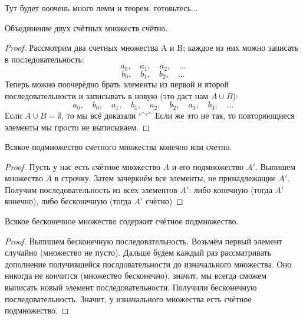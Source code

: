 Тут будет ооочень много лемм и теорем, готовьтесь...

\begin{lemma} \thmslashn

	Объединение двух счётных множеств счётно.
	
	\begin{proof} \thmslashn
	
		Рассмотрим два счетных множества A и B; каждое из них можно записать в последовательность:
		$$a_0, \quad a_1, \quad a_2, \quad ...$$
		$$b_0, \quad b_1, \quad b_2, \quad ...$$
		Теперь можно поочерёдно брать элементы из первой и второй последовательности и записывать в новую (это даст нам $A \cup B$):
		$$a_0, \quad b_0, \quad a_1, \quad b_1, \quad a_2, \quad b_2, \quad a_3, \quad b_3, \quad ...$$
		Если $A \cup B = \emptyset$, то мы всё доказали \char`\^\char`\^ \newline
		Если же это не так, то повторяющиеся элементы мы просто не выписываем.
	\end{proof}
\end{lemma}

\begin{lemma} \thmslashn

	Всякое подмножество счетного множества конечно или счетно.
	\begin{proof} \thmslashn
	
		Пусть у нас есть счётное множество $A$ и его подмножество $A'$. Выпишем множество $A$ в строчку. Затем зачеркнём все элементы, не принадлежащие $A'$. Получим последовательность из всех элементов $A'$: либо конечную (тогда $A'$ конечно), либо бесконечную (тогда $A'$ счётно)
	\end{proof}
\end{lemma}

\begin{lemma} \thmslashn

	Всякое бесконечное множество содержит счётное подмножество.
	\begin{proof} \thmslashn
	
		Выпишем бесконечную последовательность. Возьмём первый элемент случайно (множество не пусто). Дальше будем каждый раз рассматривать дополнение получившейся послдовательности до изначального множества. Оно никогда не кончится (множество бесконечно), значит, мы всегда сможем выписать новый элемент последовательности. Получили бесконечную последовательность. Значит, у изначального множества есть счётное подмножество.
	\end{proof}
\end{lemma}

